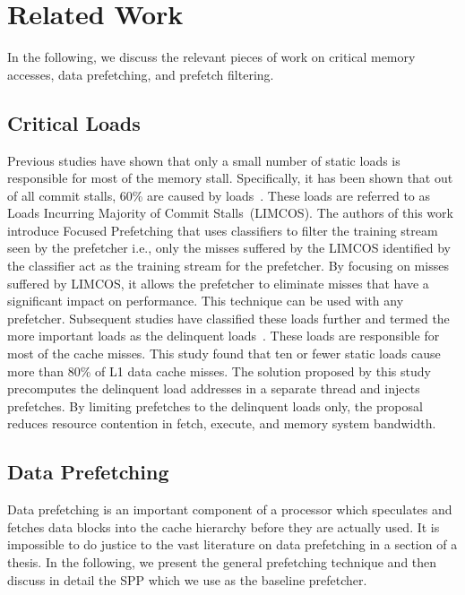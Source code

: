 \chapter{Related Work}\label{Chapter2}

In the following, we discuss the relevant pieces of work on critical memory accesses, data prefetching, and prefetch filtering.

\section{Critical Loads}
Previous studies have shown that only a small number of static loads is responsible for most of the memory stall. Specifically, it has been shown that out of all commit stalls, 60\% are caused by loads~\cite{performance oriented prefetching}. These loads are referred to as Loads Incurring Majority of Commit Stalls~(LIMCOS). The authors of this work introduce Focused Prefetching that uses classifiers to filter the training stream seen by the prefetcher i.e., only the misses suffered by the LIMCOS identified by the classifier act as the training stream for the prefetcher. By focusing on misses suffered by LIMCOS, it allows the prefetcher to eliminate misses that have
a significant impact on performance. This technique can be used with any prefetcher.
Subsequent studies have classified these loads further and termed the more important loads as the delinquent loads~\cite {Long-range prefetching}. These loads are responsible for most of the cache misses. This study found that ten or fewer static loads cause more than 80\% of L1 data cache misses. The solution proposed by this study precomputes the delinquent load addresses in a separate thread and injects prefetches. By limiting prefetches to the delinquent loads only, the proposal reduces resource contention in fetch, execute, and
 memory system bandwidth.
 
 \section{Data Prefetching}
 
 Data prefetching is an important component of a processor which  speculates and fetches data blocks into the cache hierarchy before they are actually used. It is impossible to do justice to the vast literature on data prefetching in a section of a thesis. In the following, we present the general prefetching technique and then discuss in detail the SPP which we use as the baseline prefetcher.
 
